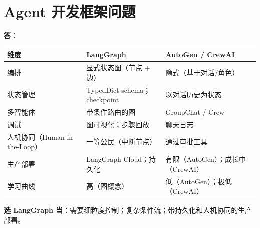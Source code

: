 \section{Agent 开发框架问题}
\label{agent-development-framework-questions}

\begin{questionbox}
\textbf{答}：

\noindent\begin{tabularx}{\linewidth}{@{}l Z{0.99} Z{1.01}@{}}
\toprule
\textbf{维度} & \textbf{LangGraph} & \textbf{AutoGen / CrewAI} \\
\midrule
编排 & 显式状态图（节点 + 边） & 隐式（基于对话/角色） \\
状态管理 & TypedDict schema；checkpoint & 以对话历史为状态 \\
多智能体 & 带条件路由的图 & GroupChat / Crew \\
调试 & 图可视化；步骤回放 & 聊天日志 \\
人机协同（Human-in-the-Loop） & 一等公民（中断节点） & 通过审批工具 \\
生产部署 & LangGraph Cloud；持久化 & 有限（AutoGen）；成长中（CrewAI） \\
学习曲线 & 高（图概念） & 低（AutoGen）；极低（CrewAI） \\
\bottomrule
\end{tabularx}

\textbf{选 LangGraph 当}：需要细粒度控制；复杂条件流；带持久化和人机协同的生产部署。


\end{questionbox}
